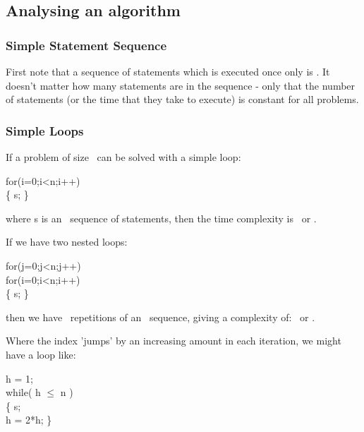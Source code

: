 %
%
%

\subsection{Analysing an algorithm}

\subsubsection{Simple Statement Sequence}
First note that a sequence of statements which is executed
once only is .
It doesn't matter how many statements are in the sequence -
only that the number of statements (or the time that they
take to execute) is constant for all problems.

\subsubsection{Simple Loops}
If a problem of size \nx\ can be solved with a simple loop: \\

\begin{Ccode}
for(i=0;i<n;i++)\\
\>	\{ s; \}\\
\end{Ccode}

where s is an \ sequence of statements, then the
time complexity is \nx{}\ or .

If we have two nested loops:

\begin{Ccode}
for(j=0;j<n;j++)\\
\>    for(i=0;i<n;i++)\\
\>\>        \{ s; \}\\
\end{Ccode}

then we have \nx\ repetitions of an \ sequence,
giving a complexity of: \nx{}\ or .

Where the index 'jumps' by an increasing amount in each iteration,
we might have a loop like: 

\begin{Ccode}
h = 1;\\
while( h $\leq$ n )\\
\>    \{ s;\\
\>    h = 2*h; \}
\end{Ccode} 


